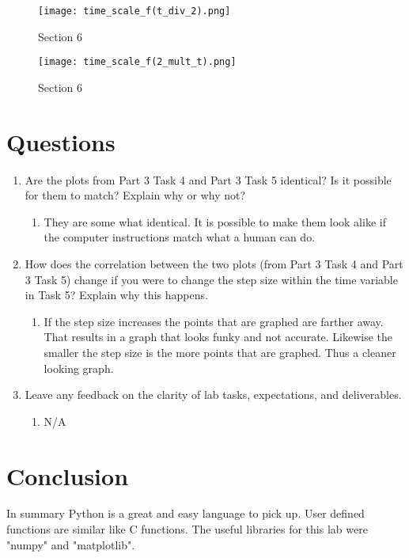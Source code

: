 \documentclass[12pt]{article}
\begin{document}
\begin{figure}[H]
\caption{Section 6}
\centering
\texttt{[image: time\_scale\_f(t\_div\_2).png]}
\end{figure}

\begin{figure}[H]
\caption{Section 6}
\centering
\texttt{[image: time\_scale\_f(2\_mult\_t).png]}
\end{figure}


\section*{Questions}

\begin{enumerate}
    \item Are the plots from  Part 3 Task 4 and Part 3 Task 5 identical? Is it possible for them to match? Explain why or why not?
    
    \begin{enumerate}
        \item They are some what identical. It is possible to make them look alike if the computer instructions match what a human can do.
    \end{enumerate}
    
    \item How does the correlation between the two plots (from Part 3 Task 4 and Part 3 Task 5)
change if you were to change the step size within the time variable in Task 5? Explain why
this happens.

    \begin{enumerate}
        \item If the step size increases the points that are graphed are farther away. That results in a graph that looks funky and not accurate. Likewise the smaller the step size is the more points that are graphed. Thus a cleaner looking graph.
    \end{enumerate}
    
    \item Leave any feedback on the clarity of lab tasks, expectations, and deliverables.
    
    \begin{enumerate}
        \item N/A
    \end{enumerate}
    
\end{enumerate}

\section*{Conclusion}
In summary Python is a great and easy language to pick up. User defined functions are similar like C functions. The useful libraries for this lab were "numpy" and "matplotlib".
\end{document}

